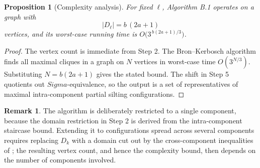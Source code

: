 \documentclass[11pt, a4paper]{article}
\newtheorem{proposition}[theorem]{Proposition}
\theoremstyle{definition}
\newtheorem{remark}[theorem]{Remark}
\def\Sigma{Sigma}%
\def\mathcal#1{#1}%
\begin{document}
\begin{proposition}[Complexity analysis]\label{prop:complexity}
For fixed $\ell$, Algorithm B.1 operates on a graph with
\[
|\mathcal D_\ell| = b\,(2a+1)
\]
vertices, and its worst-case running time is $O\bigl(3^{\,b(2a+1)/3}\bigr)$.
\end{proposition}

\begin{proof}
The vertex count is immediate from Step 2. The Bron--Kerbosch algorithm finds all maximal cliques in a graph on $N$ vertices in worst-case time $O(3^{N/3})$. Substituting $N = b(2a+1)$ gives the stated bound. The shift in Step 5 quotients out $\Sigma$-equivalence, so the output is a set of representatives of maximal intra-component partial silting configurations.
\end{proof}

\begin{remark}
The algorithm is deliberately restricted to a single component, because the domain restriction in Step 2 is derived from the intra-component staircase bound. Extending it to configurations spread across several components requires replacing $\mathcal D_k$ with a domain cut out by the cross-component inequalities of ; the resulting vertex count, and hence the complexity bound, then depends on the number of components involved.
\end{remark}
\end{document}

